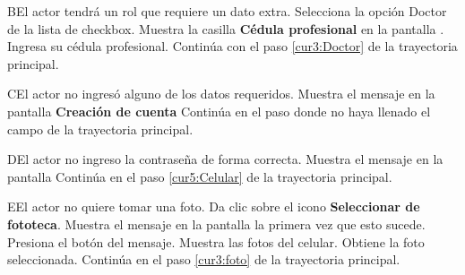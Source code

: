  \begin{UCtrayectoriaA}{B}{El actor tendrá un rol que requiere un dato extra.}
 	\UCpaso [\UCactor] Selecciona la opción Doctor de la lista de checkbox.
 	\UCpaso Muestra la casilla \textbf{Cédula profesional} en la pantalla .
 	\UCpaso [\UCactor] Ingresa su cédula profesional.
 	\UCpaso Continúa con el paso \ref{cur3:Doctor} de la trayectoria principal.
 	
   
 \end{UCtrayectoriaA}
 
\begin{UCtrayectoriaA}{C}{El actor no ingresó alguno de los datos requeridos.}
	\UCpaso[\UCsist] Muestra el mensaje  en la pantalla \textbf{Creación de cuenta}
	\UCpaso[] Continúa en el paso donde no haya llenado el campo de la trayectoria principal.
\end{UCtrayectoriaA}

\begin{UCtrayectoriaA}{D}{El actor no ingreso la contraseña de forma correcta.}
	\UCpaso[\UCsist] Muestra el mensaje  en la pantalla 
	\UCpaso[] Continúa en el paso \ref{cur5:Celular} de la trayectoria principal.
\end{UCtrayectoriaA}

\begin{UCtrayectoriaA}{E}{El actor no quiere tomar una foto.}
	\UCpaso [\UCactor] Da clic sobre el icono \textbf{Seleccionar de fototeca}.
	\UCpaso Muestra el mensaje  en la pantalla  la primera vez que esto sucede.
	\UCpaso [\UCactor] Presiona el botón  del mensaje.
	\UCpaso Muestra las fotos del celular.
	\UCpaso Obtiene la foto seleccionada.
	\UCpaso Continúa en el paso \ref{cur3:foto} de la trayectoria principal.
	
\end{UCtrayectoriaA}
 

